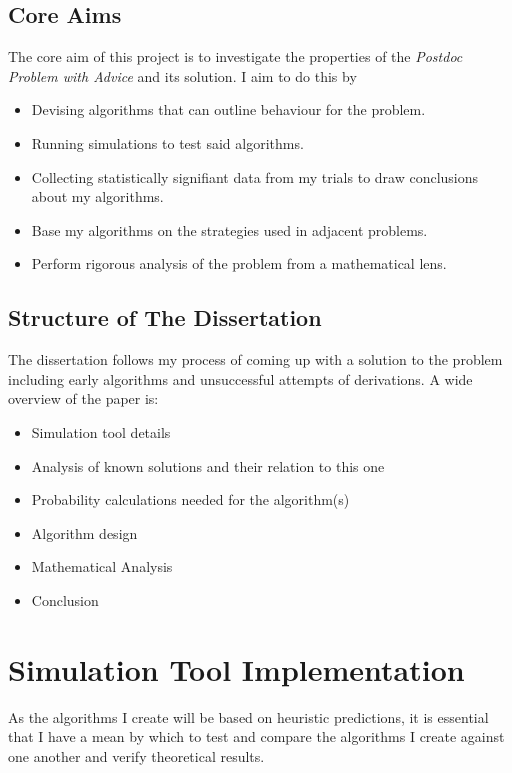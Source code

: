 \documentclass[a4paper,11pt]{article}
\begin{document}
\subsection{Core Aims}

The core aim of this project is to investigate the properties of the \textit{Postdoc Problem with Advice} and its solution. I aim to do this by 

\begin{itemize}
    \item Devising algorithms that can outline behaviour for the problem.
    \item Running simulations to test said algorithms.
    \item Collecting statistically signifiant data from my trials to draw conclusions about my algorithms.
    \item Base my algorithms on the strategies used in adjacent problems.
    \item Perform rigorous analysis of the problem from a mathematical lens.
\end{itemize}


\subsection{Structure of The Dissertation}

The dissertation follows my process of coming up with a solution to the problem including early algorithms and unsuccessful attempts of derivations. A wide overview of the paper is:

\begin{itemize}
    \item Simulation tool details
    \item Analysis of known solutions and their relation to this one
    \item Probability calculations needed for the algorithm(s)
    \item Algorithm design
    \item Mathematical Analysis
    \item Conclusion
\end{itemize}

\section{Simulation Tool Implementation}
\label{sec:desgin}

As the algorithms I create will be based on heuristic predictions, it is essential that I have a mean by which to test and compare the algorithms I create against one another and verify theoretical results.
\end{document}
